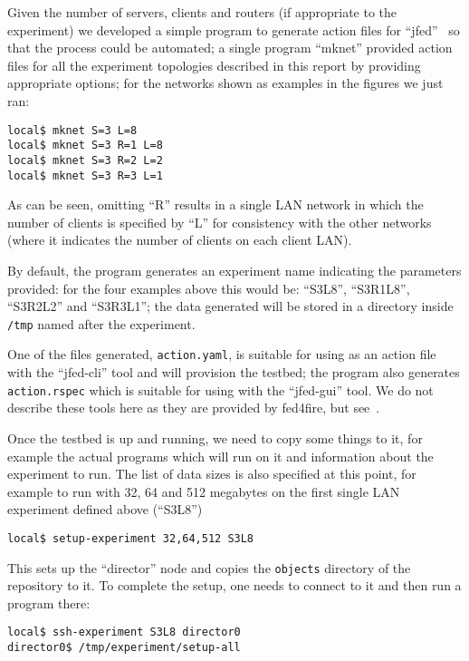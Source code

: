 \documentclass[a4paper,12pt]{article}
\begin{document}
Given the number of servers, clients and routers (if appropriate to the
experiment) we developed a simple program to generate action files
for ``jfed''~\cite{jfed} so that the process could be automated; a single program
``mknet'' provided action files for all the experiment topologies
described in this report by providing appropriate options; for the
networks shown as examples in the figures we just ran:

\begin{verbatim}
local$ mknet S=3 L=8
local$ mknet S=3 R=1 L=8
local$ mknet S=3 R=2 L=2
local$ mknet S=3 R=3 L=1
\end{verbatim}

As can be seen, omitting ``R'' results in a single LAN network in which
the number of clients is specified by ``L'' for consistency with the
other networks (where it indicates the number of clients on each client
LAN).

By default, the program generates an experiment name indicating the parameters
provided: for the four examples above this would be: ``S3L8'', ``S3R1L8'',
``S3R2L2'' and ``S3R3L1''; the data generated will be stored in a
directory inside {\tt/tmp} named after the experiment.

One of the files generated, {\tt action.yaml}, is suitable for using as
an action file with the ``jfed-cli'' tool and will provision the testbed;
the program also generates {\tt action.rspec} which is suitable for
using with the ``jfed-gui'' tool.  We do not describe these tools here
as they are provided by fed4fire, but see~\cite{jfed}.

Once the testbed is up and running, we need to copy some things to it,
for example the actual programs which will run on it and information about
the experiment to run.  The list of data sizes is also specified at
this point, for example to run with 32, 64 and 512 megabytes on the
first single LAN experiment defined above (``S3L8'')

\begin{verbatim}
local$ setup-experiment 32,64,512 S3L8
\end{verbatim}

This sets up the ``director'' node and copies the {\tt objects} directory
of the repository to it.  To complete the setup, one needs to connect to
it and then run a program there:

\begin{verbatim}
local$ ssh-experiment S3L8 director0
director0$ /tmp/experiment/setup-all
\end{verbatim}
\end{document}
